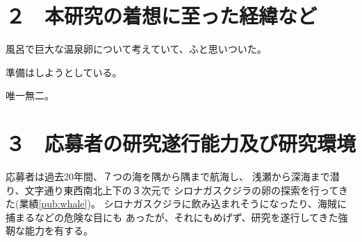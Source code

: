 \documentclass[11pt,a4j,dvipdfmx]{jarticle} 					%
\newcommand{\研究課題名}{\mgfamily\sffamily ストカスティック形式でせまる重力と量子論}
\newcommand{\研究機関名}{\mgfamily\sffamily 名古屋大学}
\newcommand{\研究代表者氏名}{\mgfamily\sffamily 多田祐一郎}
\newcommand{\研究期間の最終元号年度}{34}  %
\begin{document}



\section{２　本研究の着想に至った経緯など}

		風呂で巨大な温泉卵について考えていて、ふと思いついた。

	準備はしようとしている。

	唯一無二。




\section{３　応募者の研究遂行能力及び研究環境}

	応募者は過去20年間、７つの海を隅から隅まで航海し、
	浅瀬から深海まで潜り、文字通り東西南北上下の３次元で
	シロナガスクジラの卵の探索を行ってきた(業績\ref{pub:whale})。
	シロナガスクジラに飲み込まれそうになったり、海賊に捕まるなどの危険な目にも
	あったが、それにもめげず、研究を遂行してきた強靭な能力を有する。
\end{document}
